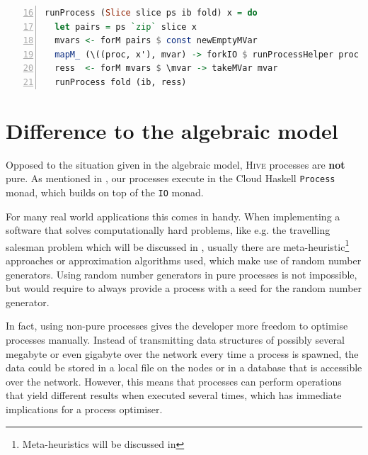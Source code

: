 \begin{lstlisting}[language=Haskell,caption=Implementation of the interpreter for \texttt{Slice} processes.,label=lst:local_runprocess_multilel,numbers=left,frame=bt,firstnumber=16]
runProcess (Slice slice ps ib fold) x = do
  let pairs = ps `zip` slice x
  mvars <- forM pairs $ const newEmptyMVar
  mapM_ (\((proc, x'), mvar) -> forkIO $ runProcessHelper proc x' mvar) (pairs `zip` mvars)
  ress  <- forM mvars $ \mvar -> takeMVar mvar
  runProcess fold (ib, ress)
\end{lstlisting}



\section{Difference to the algebraic model}
\label{chp:difference_model_implementation}
Opposed to the situation given in the algebraic model, \textsc{Hive} processes are \textbf{not} pure. As mentioned in , our processes execute in the \textsf{Cloud Haskell} \texttt{Process} monad, which builds on top of the \texttt{IO} monad.

For many real world applications this comes in handy. When implementing a software that solves computationally hard problems, like e.g. the travelling salesman problem which will be discussed in , usually there are meta-heuristic\footnote{Meta-heuristics will be discussed in } approaches or approximation algorithms \cite{rolf2006approximationsalgorithmen} used, which make use of random number generators. Using random number generators in pure processes is not impossible, but would require to always provide a process with a seed for the random number generator.

In fact, using non-pure processes gives the developer more freedom to optimise processes manually. Instead of transmitting data structures of possibly several megabyte or even gigabyte over the network every time a process is spawned, the data could be stored in a local file on the nodes or in a database that is accessible over the network. However, this means that processes can perform operations that yield different results when executed several times, which has immediate implications for a process optimiser.

